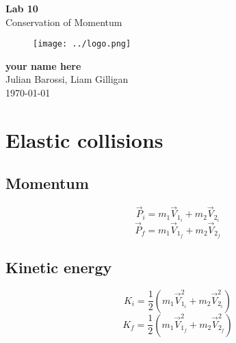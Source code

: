 \documentclass[11pt, letterpaper, includehead]{article}
\begin{document}
\begin{titlepage}
  \begin{center}
    \Huge{\textbf{Lab 10}}\\
    \Huge{Conservation of Momentum}
    \vfill
    \begin{figure}[H] %
      \centering 
      \texttt{[image: ../logo.png]}
    \end{figure}
    \large{\textbf{your name here}}\\
    \large{Julian Barossi, Liam Gilligan}\\
    \vspace{0.5cm}
    \normalsize
    \today
  \end{center}
\end{titlepage}

\tableofcontents
\pagebreak %


\section{Elastic collisions} 
\subsection{Momentum}
$$\vec{P}_i = m_1\vec{V}_{1_i} + m_2\vec{V}_{2_i}$$
$$\vec{P}_f = m_1\vec{V}_{1_f} + m_2\vec{V}_{2_f}$$

\subsection{Kinetic energy}
$$K_i = \frac{1}{2}(m_1 \vec{V}_{1_i}^2 + m_2 \vec{V}_{2_i}^2)$$
$$K_f = \frac{1}{2}(m_1 \vec{V}_{1_f}^2 + m_2 \vec{V}_{2_f}^2)$$
\end{document}
